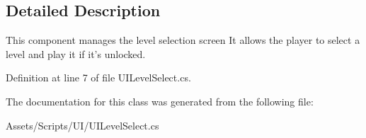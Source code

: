 \subsection{Detailed Description}
This component manages the level selection screen It allows the player to select a level and play it if it's unlocked. 



Definition at line 7 of file U\+I\+Level\+Select.\+cs.



The documentation for this class was generated from the following file\+:\begin{DoxyCompactItemize}
\item 
Assets/\+Scripts/\+U\+I/U\+I\+Level\+Select.\+cs\end{DoxyCompactItemize}

